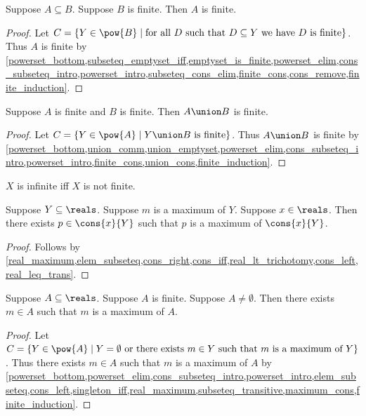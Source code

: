 \begin{lemma} \label{subseteq_finite_is_finite}
    Suppose $A\subseteq B$.
    Suppose $B$ is finite.
    Then $A$ is finite.
\end{lemma}
\begin{proof}
    Let $C=\{Y\in\pow{B}\mid \text{for all $D$ such that $D\subseteq Y$ we have $D$ is finite}\}$.
    Thus $A$ is finite by \cref{powerset_bottom,subseteq_emptyset_iff,emptyset_is_finite,powerset_elim,cons_subseteq_intro,powerset_intro,subseteq_cons_elim,finite_cons,cons_remove,finite_induction}.
\end{proof}

\begin{lemma} \label{union_of_finite_is_finite}
    Suppose $A$ is finite and $B$ is finite.
    Then $A\union B$ is finite.
\end{lemma}
\begin{proof}
    Let $C=\{Y\in\pow{A}\mid \text{$Y\union B$ is finite}\}$.
    Thus $A\union B$ is finite by \cref{powerset_bottom,union_comm,union_emptyset,powerset_elim,cons_subseteq_intro,powerset_intro,finite_cons,union_cons,finite_induction}.
\end{proof}

\begin{abbreviation}\label{infinite}
    $X$ is infinite iff $X$ is not finite.
\end{abbreviation}


\begin{lemma}\label{maximum_cons}
    Suppose $Y\subseteq\reals$.
    Suppose $m$ is a maximum of $Y$.
    Suppose $x\in\reals$.
    Then there exists $p\in\cons{x}{Y}$ such that $p$ is a maximum of $\cons{x}{Y}$.
\end{lemma}
\begin{proof}
    Follows by \cref{real_maximum,elem_subseteq,cons_right,cons_iff,real_lt_trichotomy,cons_left,real_leq_trans}.
\end{proof}

\begin{lemma}\label{finite_real_maximum}
    Suppose $A\subseteq\reals$.
    Suppose $A$ is finite.
    Suppose $A\neq \emptyset$.
    Then there exists $m\in A$ such that $m$ is a maximum of $A$.
\end{lemma}
\begin{proof}
    Let $C=\{Y\in\pow{A}\mid \text{$Y=\emptyset$ or there exists $m\in Y$ such that $m$ is a maximum of $Y$}\}$.
    Thus there exists $m\in A$ such that $m$ is a maximum of $A$ by \cref{powerset_bottom,powerset_elim,cons_subseteq_intro,powerset_intro,elem_subseteq,cons_left,singleton_iff,real_maximum,subseteq_transitive,maximum_cons,finite_induction}.
\end{proof}

